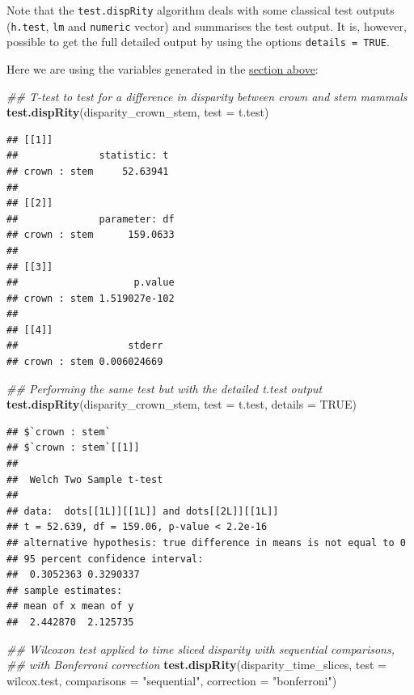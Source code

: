\documentclass[]{book}
\newenvironment{Shaded}{\begin{snugshade}}{\end{snugshade}}
\newcommand{\CommentTok}[1]{\textcolor[rgb]{0.56,0.35,0.01}{\textit{#1}}}
\newcommand{\DataTypeTok}[1]{\textcolor[rgb]{0.13,0.29,0.53}{#1}}
\newcommand{\KeywordTok}[1]{\textcolor[rgb]{0.13,0.29,0.53}{\textbf{#1}}}
\newcommand{\NormalTok}[1]{#1}
\newcommand{\OtherTok}[1]{\textcolor[rgb]{0.56,0.35,0.01}{#1}}
\newcommand{\StringTok}[1]{\textcolor[rgb]{0.31,0.60,0.02}{#1}}
\begin{document}
Note that the \texttt{test.dispRity} algorithm deals with some classical test outputs (\texttt{h.test}, \texttt{lm} and \texttt{numeric} vector) and summarises the test output.
It is, however, possible to get the full detailed output by using the options \texttt{details\ =\ TRUE}.

Here we are using the variables generated in the \protect\hyperlink{summarising-dispRity-data-plots}{section above}:

\begin{Shaded}
\begin{Highlighting}[]
\CommentTok{## T-test to test for a difference in disparity between crown and stem mammals}
\KeywordTok{test.dispRity}\NormalTok{(disparity_crown_stem, }\DataTypeTok{test =}\NormalTok{ t.test)}
\end{Highlighting}
\end{Shaded}

\begin{verbatim}
## [[1]]
##              statistic: t
## crown : stem     52.63941
## 
## [[2]]
##              parameter: df
## crown : stem      159.0633
## 
## [[3]]
##                    p.value
## crown : stem 1.519027e-102
## 
## [[4]]
##                   stderr
## crown : stem 0.006024669
\end{verbatim}

\begin{Shaded}
\begin{Highlighting}[]
\CommentTok{## Performing the same test but with the detailed t.test output}
\KeywordTok{test.dispRity}\NormalTok{(disparity_crown_stem, }\DataTypeTok{test =}\NormalTok{ t.test, }\DataTypeTok{details =} \OtherTok{TRUE}\NormalTok{)}
\end{Highlighting}
\end{Shaded}

\begin{verbatim}
## $`crown : stem`
## $`crown : stem`[[1]]
## 
##  Welch Two Sample t-test
## 
## data:  dots[[1L]][[1L]] and dots[[2L]][[1L]]
## t = 52.639, df = 159.06, p-value < 2.2e-16
## alternative hypothesis: true difference in means is not equal to 0
## 95 percent confidence interval:
##  0.3052363 0.3290337
## sample estimates:
## mean of x mean of y 
##  2.442870  2.125735
\end{verbatim}

\begin{Shaded}
\begin{Highlighting}[]
\CommentTok{## Wilcoxon test applied to time sliced disparity with sequential comparisons,}
\CommentTok{## with Bonferroni correction}
\KeywordTok{test.dispRity}\NormalTok{(disparity_time_slices, }\DataTypeTok{test =}\NormalTok{ wilcox.test,}
              \DataTypeTok{comparisons =} \StringTok{"sequential"}\NormalTok{, }\DataTypeTok{correction =} \StringTok{"bonferroni"}\NormalTok{)}
\end{Highlighting}
\end{Shaded}
\end{document}
